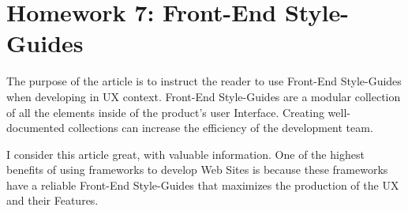 \chapter{Homework 7: Front-End Style-Guides}
	The purpose of the article is to instruct the reader to use Front-End Style-Guides when developing in UX context. Front-End Style-Guides are a modular collection of all the elements inside of the product's user Interface. Creating well-documented collections can increase the efficiency of the development team.

	I consider this article great, with valuable information. One of the highest benefits of using frameworks to develop Web Sites is because these frameworks have a reliable Front-End Style-Guides that maximizes the production of the UX and their Features.
